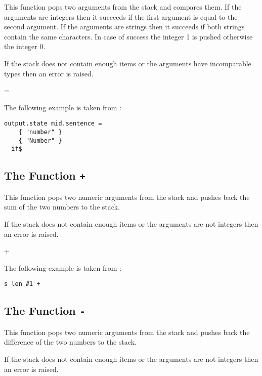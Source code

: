 This function pops two arguments from the stack and compares them.
If the arguments are integers then it succeeds if the first argument is
equal to the second argument. If the arguments are strings then it
succeeds if both strings contain the same characters. In case of
success the integer 1 is pushed otherwise the integer 0.

If the stack does not contain enough items or the arguments have
incomparable types then an error is raised.

\begin{BstFunction}{=}
\end{BstFunction}

The following example is taken from :

\begin{lstlisting}[language=bst]
    output.state mid.sentence =
    { "number" }
    { "Number" }
  if$
\end{lstlisting}


\subsection{The Function \texttt{+}}%
\fctIndex{+}

This function pops two numeric arguments from the stack and
pushes back the sum of the two numbers to the stack.

If the stack does not contain enough items or the arguments are not
integers then an error is raised.

\begin{BstFunction}{+}
\end{BstFunction}

The following example is taken from :

\begin{lstlisting}[language=bst]
    s len #1 +
\end{lstlisting}


\subsection{The Function \texttt{-}}%
\fctIndex{-}

This function pops two numeric arguments from the stack and
pushes back the difference of the two numbers to the stack.

If the stack does not contain enough items or the arguments are not
integers then an error is raised.

